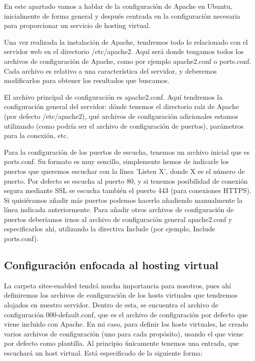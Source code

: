 \documentclass[a4paper, 10pt]{article} %
\begin{document}
En este apartado vamos a hablar de la configuración de Apache en Ubuntu, inicialmente de forma general y después centrada en la configuración necesaria para proporcionar un servicio de hosting virtual. 

Una vez realizada la instalación de Apache, tendremos todo lo relacionado con el servidor web en el directorio /etc/apache2. Aquí será donde tengamos todos los archivos de configuración de Apache, como por ejemplo apache2.conf o ports.conf. Cada archivo es relativo a una característica del servidor, y deberemos modificarlos para obtener los resultados que buscamos. 

El archivo principal de configuración es apache2.conf. Aquí tendremos la configuración general del servidor: dónde tenemos el directorio raíz de Apache (por defecto /etc/apache2), qué archivos de configuración adicionales estamos utilizando (como podría ser el archivo de configuración de puertos), parámetros para la conexión, etc. 

Para la configuración de los puertos de escucha, tenemos un archivo inicial que es ports.conf. Su formato es muy sencillo, simplemente hemos de indicarle los puertos que queremos escuchar con la línea 'Listen X', donde X es el número de puerto. Por defecto se escucha al puerto 80, y si tenemos posibilidad de conexión segura mediante SSL se escucha también el puerto 443 (para conexiones HTTPS). Si quisiéramos añadir más puertos podemos hacerlo añadiendo manualmente la línea indicada anteriormente. Para añadir otros archivos de configuración de puertos deberíamos irnos al archivo de configuración general apache2.conf y especificarlos ahí, utilizando la directiva Include (por ejemplo, Include ports.conf).

\subsection{Configuración enfocada al hosting virtual}

La carpeta sites-enabled tendrá mucha importancia para nosotros, pues ahí definiremos los archivos de configuración de los hosts virtuales que tendremos alojados en nuestro servidor. Dentro de esta, se encuentra el archivo de configuración 000-default.conf, que es el archivo de configuración por defecto que viene incluido con Apache. En mi caso, para definir los hosts virtuales, he creado varios archivos de configuración (uno para cada propósito), usando el que viene por defecto como plantilla. Al principio únicamente tenemos una entrada, que escuchará un host virtual. Está especificado de la siguiente forma: 
\end{document}
